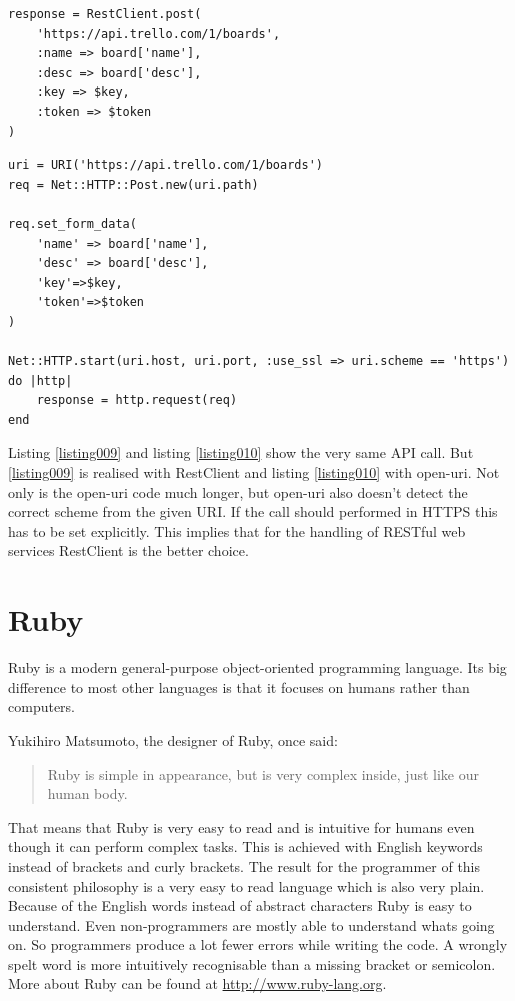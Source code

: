 \begin{lstlisting}[aboveskip=1\baselineskip, caption=POST request using RestClient., label=listing009]
response = RestClient.post(
	'https://api.trello.com/1/boards',
	:name => board['name'], 
	:desc => board['desc'],
	:key => $key,
	:token => $token
)
\end{lstlisting}

\begin{lstlisting}[aboveskip=1\baselineskip, caption=POST request with open-uri., label=listing010]
uri = URI('https://api.trello.com/1/boards')
req = Net::HTTP::Post.new(uri.path)

req.set_form_data(
	'name' => board['name'], 
	'desc' => board['desc'],
	'key'=>$key,
	'token'=>$token
)

Net::HTTP.start(uri.host, uri.port, :use_ssl => uri.scheme == 'https') do |http|
	response = http.request(req)
end
\end{lstlisting}

Listing \ref{listing009} and listing \ref{listing010} show the very same API call. But \ref{listing009} is realised with RestClient and listing \ref{listing010} with open-uri. Not only is the open-uri code much longer, but open-uri also doesn't detect the correct scheme from the given URI. If the call should performed in HTTPS this has to be set explicitly. This implies that for the handling of RESTful web services RestClient is the better choice.


\section{Ruby}
Ruby is a modern general-purpose object-oriented programming language. Its big difference to most other languages is that it focuses on humans rather than computers. 

Yukihiro Matsumoto, the designer of Ruby, once said:
\begin{quote}
Ruby is simple in appearance, but is very
complex inside, just like our human body.\cite{ruby:talk}
\end{quote}

That means that Ruby is very easy to read and is intuitive for humans even though it can perform complex tasks. This is achieved with English keywords instead of brackets and curly brackets. The result for the programmer of this consistent philosophy is a very easy to read language which is also very plain. Because of the English words instead of abstract characters Ruby is easy to understand. Even non-programmers are mostly able to understand whats going on. So programmers produce a lot fewer errors while writing the code. A wrongly spelt word is more intuitively recognisable than a missing bracket or semicolon. \cite{ruby:about} More about Ruby can be found at \url{http://www.ruby-lang.org}.

